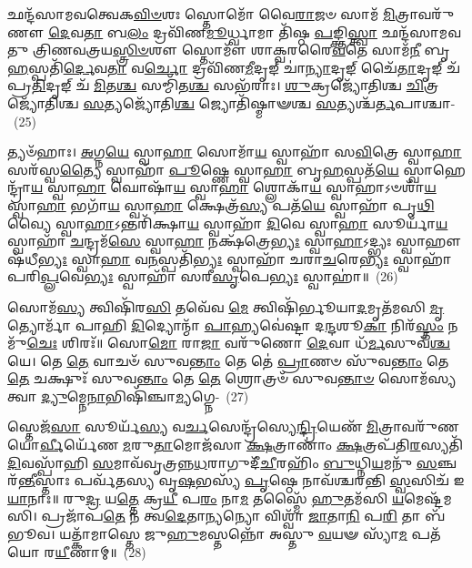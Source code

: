 𑌛𑌨𑍍𑌦᳴𑌸𑌾𑌮𑌵𑌤𑍍𑌵𑍇𑌕\-\ul{𑌵𑌿}\-\-\ul{𑍞}\-𑌶𑌃 𑌸𑍍𑌤𑍋𑌮𑍋᳴ 𑌵𑍈\-\ul{𑌰𑌾}\-𑌜𑍞 𑌸𑌾𑌮᳴ \ul{𑌮𑌿}\-𑌤𑍍𑌰𑌾𑌵𑌰𑍁᳴𑌣𑍗 \ul{𑌦𑍇}\-𑌵\-\ul{𑌤𑌾} 𑌬\-\ul{𑌲𑌂} 𑌦𑍍𑌰𑌵𑌿᳴𑌣\-\ul{𑌮𑍂}\-𑌰𑍍𑌧𑍍𑌵𑌾𑌮𑌾 𑌤𑌿᳴𑌷𑍍𑌠 \ul{𑌪}\-𑌙𑍍𑌕𑍍𑌤𑌿\-\ul{𑌸𑍍𑌤𑍍𑌵𑌾} 𑌛𑌨𑍍𑌦᳴𑌸𑌾𑌮𑌵𑌤𑍁 𑌤𑍍𑌰𑌿𑌣𑌵𑌤𑍍𑌰𑌯\-\ul{𑌸𑍍𑌤𑍍𑌰𑌿}\-\-\ul{𑍞}\-𑌶𑍗 𑌸𑍍𑌤𑍋𑌮𑍗᳴ 𑌶𑌾𑌕𑍍𑌵𑌰𑌰𑍈\-\ul{𑌵}\-𑌤𑍇 𑌸𑌾𑌮᳴\-\ul{𑌨𑍀} 𑌬𑍃\-\ul{𑌹}\-𑌸𑍍𑌪𑌤𑌿᳴\-\ul{𑌰𑍍𑌦𑍇}\-𑌵\-\ul{𑌤𑌾} 𑌵\-\ul{𑌰𑍍𑌚𑍋} 𑌦𑍍𑌰𑌵𑌿᳴𑌣\-\ul{𑌮𑍀}\-𑌦𑍃𑌙𑍍 𑌚𑌾॑\-\ul{𑌨𑍍𑌯𑌾}\-𑌦𑍃𑌙𑍍 𑌚𑍈᳴\-\ul{𑌤𑌾}\-𑌦𑍃𑌙𑍍 𑌚᳴ 𑌪𑍍𑌰\-\ul{𑌤𑌿}\-𑌦𑍃𑌙𑍍 𑌚᳴ \ul{𑌮𑌿}\-𑌤\-\ul{𑌶𑍍𑌚} 𑌸𑌮𑍍𑌮𑌿᳴𑌤\-\ul{𑌶𑍍𑌚} 𑌸𑌭᳴𑌰𑌾𑌃। \ul{𑌶𑍁}\-𑌕𑍍𑌰𑌜𑍍𑌯𑍋᳴𑌤𑌿𑌶𑍍𑌚 \ul{𑌚𑌿}\-𑌤𑍍𑌰𑌜𑍍𑌯𑍋᳴𑌤𑌿𑌶𑍍𑌚 \ul{𑌸}\-𑌤𑍍𑌯𑌜𑍍𑌯𑍋᳴𑌤𑌿\-\ul{𑌶𑍍𑌚} 𑌜𑍍𑌯𑍋𑌤𑌿᳴𑌷𑍍𑌮𑌾𑍟𑌶𑍍𑌚 \ul{𑌸}\-𑌤𑍍𑌯𑌶𑍍𑌚᳴\-\ul{𑌰𑍍𑌤}\-𑌪𑌾𑌶𑍍𑌚𑌾-~(25)

𑌤𑍍𑌯𑍞᳴𑌹𑌾𑌃। \ul{𑌅}\-𑌗𑍍𑌨\-\ul{𑌯𑍇} 𑌸𑍍𑌵𑌾\-\ul{𑌹𑌾} 𑌸𑍋𑌮𑌾᳴\-\ul{𑌯} 𑌸𑍍𑌵𑌾𑌹𑌾᳴ 𑌸\-\ul{𑌵𑌿}\-𑌤𑍍𑌰𑍇 𑌸𑍍𑌵𑌾\-\ul{𑌹𑌾} 𑌸𑌰᳴𑌸𑍍𑌵\-\ul{𑌤𑍍𑌯𑍈} 𑌸𑍍𑌵𑌾𑌹𑌾᳴ \ul{𑌪𑍂}\-𑌷𑍍𑌣𑍇 𑌸𑍍𑌵𑌾\-\ul{𑌹𑌾} 𑌬𑍃\-\ul{𑌹}\-𑌸𑍍𑌪𑌤᳴\-\ul{𑌯𑍇} 𑌸𑍍𑌵𑌾𑌹𑍇𑌨𑍍𑌦𑍍𑌰𑌾᳴\-\ul{𑌯} 𑌸𑍍𑌵𑌾\-\ul{𑌹𑌾} 𑌘𑍋𑌷𑌾᳴\-\ul{𑌯} 𑌸𑍍𑌵𑌾\-\ul{𑌹𑌾} 𑌶𑍍𑌲𑍋𑌕𑌾᳴\-\ul{𑌯} 𑌸𑍍𑌵𑌾𑌹𑌾\-𑌽𑍞𑌶𑌾᳴\-\ul{𑌯} 𑌸𑍍𑌵𑌾\-\ul{𑌹𑌾} 𑌭𑌗𑌾᳴\-\ul{𑌯} 𑌸𑍍𑌵𑌾\-\ul{𑌹𑌾} 𑌕𑍍𑌷𑍇𑌤𑍍𑌰᳴\-\ul{𑌸𑍍𑌯} 𑌪𑌤᳴\-\ul{𑌯𑍇} 𑌸𑍍𑌵𑌾𑌹𑌾᳴ 𑌪𑍃\-\ul{𑌥𑌿}\-𑌵𑍍𑌯𑍈 𑌸𑍍𑌵𑌾\-\ul{𑌹𑌾}\-\-𑌽𑌨𑍍𑌤𑌰𑌿᳴𑌕𑍍𑌷𑌾\-\ul{𑌯} 𑌸𑍍𑌵𑌾𑌹𑌾᳴ \ul{𑌦𑌿}\-𑌵𑍇 𑌸𑍍𑌵𑌾\-\ul{𑌹𑌾} 𑌸𑍂𑌰𑍍𑌯𑌾᳴\-\ul{𑌯} 𑌸𑍍𑌵𑌾𑌹𑌾᳴ \ul{𑌚}\-𑌨𑍍𑌦𑍍𑌰𑌮᳴\-\ul{𑌸𑍇} 𑌸𑍍𑌵𑌾\-\ul{𑌹𑌾} 𑌨𑌕𑍍𑌷᳴𑌤𑍍𑌰𑍇\-\ul{𑌭𑍍𑌯𑌃} 𑌸𑍍𑌵𑌾\-\ul{𑌹𑌾}\-\-𑌽𑌦𑍍𑌭𑍍𑌯𑌃 𑌸𑍍𑌵𑌾𑌹𑍗𑌷᳴𑌧𑍀\-\ul{𑌭𑍍𑌯𑌃} 𑌸𑍍𑌵𑌾\-\ul{𑌹𑌾} 𑌵\-\ul{𑌨}\-𑌸𑍍𑌪𑌤𑌿᳴\-\ul{𑌭𑍍𑌯𑌃} 𑌸𑍍𑌵𑌾𑌹𑌾᳴ 𑌚𑌰𑌾\-\ul{𑌚}\-𑌰𑍇\-\ul{𑌭𑍍𑌯𑌃} 𑌸𑍍𑌵𑌾𑌹𑌾᳴ 𑌪𑌰𑌿\-\ul{𑌪𑍍𑌲}\-𑌵𑍇\-\ul{𑌭𑍍𑌯𑌃} 𑌸𑍍𑌵𑌾𑌹𑌾᳴ 𑌸𑌰𑍀\-\ul{𑌸𑍃}\-𑌪𑍇\-\ul{𑌭𑍍𑌯𑌃} 𑌸𑍍𑌵𑌾𑌹𑌾॑॥~(26)

{\anuvakamend[{\-\ul{𑌅}\-\-\ul{𑌨𑍁}\-𑌷𑍍𑌟𑍁𑌪𑍍𑌤𑍍𑌵᳴\-\ul{𑌰𑍍𑌤}\-𑌪𑌾𑌶𑍍𑌚᳴ 𑌸𑌰𑍀\-\ul{𑌸𑍃}\-𑌪𑍇\-\ul{𑌭𑍍𑌯𑌃} 𑌸𑍍𑌵𑌾𑌹𑌾॑}]}%

𑌸𑍋𑌮᳴\-\ul{𑌸𑍍𑌯} 𑌤𑍍𑌵𑌿𑌷𑌿᳴𑌰\-\ul{𑌸𑌿} 𑌤𑌵𑍇᳴𑌵 \ul{𑌮𑍇} 𑌤𑍍𑌵𑌿𑌷𑌿᳴𑌰𑍍𑌭𑍂𑌯𑌾\-\ul{𑌦}\-𑌮𑍃𑌤᳴𑌮𑌸𑌿 \ul{𑌮𑍃}\-𑌤𑍍𑌯𑍋𑌰𑍍𑌮𑌾᳴ 𑌪𑌾𑌹𑌿 \ul{𑌦𑌿}\-𑌦𑍍𑌯𑍋𑌨𑍍𑌮𑌾᳴ \ul{𑌪𑌾}\-𑌹𑍍𑌯𑌵𑍇॑𑌷𑍍𑌟𑌾 𑌦\-\ul{𑌨𑍍𑌦}\-𑌶𑍂\-\ul{𑌕𑌾} 𑌨𑌿𑌰᳴\-\ul{𑌸𑍍𑌤𑌂} 𑌨𑌮𑍁᳴\-\ul{𑌚𑍇𑌃} 𑌶𑌿𑌰𑌃᳴॥ 𑌸𑍋\-\ul{𑌮𑍋} 𑌰𑌾\-\ul{𑌜𑌾} 𑌵𑌰𑍁᳴𑌣𑍋 \ul{𑌦𑍇}\-𑌵𑌾 𑌧᳴\-\ul{𑌰𑍍𑌮}\-𑌸𑍁𑌵᳴\-\ul{𑌶𑍍𑌚} 𑌯𑍇। 𑌤𑍇 \ul{𑌤𑍇} 𑌵𑌾𑌚𑍞᳴ 𑌸𑍁𑌵\-\ul{𑌨𑍍𑌤𑌾𑌂} 𑌤𑍇 𑌤𑍇॑ \ul{𑌪𑍍𑌰𑌾}\-𑌣𑍞 𑌸𑍁᳴𑌵\-\ul{𑌨𑍍𑌤𑌾𑌂} 𑌤𑍇 \ul{𑌤𑍇} 𑌚𑌕𑍍𑌷𑍁𑌃᳴ 𑌸𑍁𑌵\-\ul{𑌨𑍍𑌤𑌾𑌂} 𑌤𑍇 \ul{𑌤𑍇} 𑌶𑍍𑌰𑍋𑌤𑍍𑌰𑍞᳴ 𑌸𑍁𑌵\-\ul{𑌨𑍍𑌤𑌾}\-\-\ul{𑍞} 𑌸𑍋𑌮᳴𑌸𑍍𑌯 𑌤𑍍𑌵𑌾 \ul{𑌦𑍍𑌯𑍁}\-𑌮𑍍𑌨𑍇\-\ul{𑌨𑌾}\-𑌭𑌿𑌷𑌿᳴𑌞𑍍𑌚𑌾\-\ul{𑌮𑍍𑌯}\-𑌗𑍍𑌨𑍇-~(27)

𑌸𑍍𑌤𑍇𑌜᳴\-\ul{𑌸𑌾} 𑌸𑍂𑌰𑍍𑌯᳴\-\ul{𑌸𑍍𑌯} 𑌵\-\ul{𑌰𑍍𑌚}\-𑌸𑍇𑌨𑍍𑌦𑍍𑌰᳴𑌸𑍍𑌯𑍇\-\ul{𑌨𑍍𑌦𑍍𑌰𑌿}\-𑌯𑍇𑌣᳴ \ul{𑌮𑌿}\-𑌤𑍍𑌰𑌾𑌵𑌰𑍁᳴𑌣𑌯𑍋\-\ul{𑌰𑍍𑌵𑍀}\-𑌰𑍍𑌯𑍇᳴𑌣 \ul{𑌮}\-𑌰𑍁\-\ul{𑌤𑌾}\-𑌮𑍋𑌜᳴𑌸𑌾 \ul{𑌕𑍍𑌷}\-𑌤𑍍𑌰𑌾𑌣𑌾𑌂॑ \ul{𑌕𑍍𑌷}\-𑌤𑍍𑌰𑌪᳴𑌤𑌿\-\ul{𑌰}\-𑌸𑍍𑌯𑌤𑌿᳴ \ul{𑌦𑌿}\-𑌵𑌸𑍍𑌪𑌾᳴𑌹𑌿 \ul{𑌸}\-𑌮𑌾𑌵᳴𑌵𑍃𑌤𑍍𑌰𑌨𑍍𑌨\-\ul{𑌧}\-𑌰𑌾𑌗𑍁𑌦𑍀᳴\-\ul{𑌚𑍀}\-𑌰𑌹𑌿𑌂᳴ \ul{𑌬𑍁}\-𑌧𑍍𑌨𑌿\-\ul{𑌯}\-𑌮𑌨𑍁᳴ \ul{𑌸}\-𑌞𑍍𑌚𑌰᳴\-\ul{𑌨𑍍𑌤𑍀}\-𑌸𑍍𑌤𑌾𑌃 𑌪𑌰𑍍𑌵᳴𑌤𑌸𑍍𑌯 𑌵𑍃\-\ul{𑌷}\-𑌭𑌸𑍍𑌯᳴ \ul{𑌪𑍃}\-𑌷𑍍𑌠𑍇 𑌨𑌾𑌵᳴𑌶𑍍𑌚𑌰𑌨𑍍𑌤𑌿 \ul{𑌸𑍍𑌵}\-𑌸𑌿𑌚᳴ 𑌇\-\ul{𑌯𑌾}\-𑌨𑌾𑌃॥ 𑌰𑍁\-\ul{𑌦𑍍𑌰} 𑌯\-\ul{𑌤𑍍𑌤𑍇} 𑌕𑍍𑌰\-\ul{𑌯𑍀} 𑌪\-\ul{𑌰𑌂} 𑌨𑌾\-\ul{𑌮} 𑌤𑌸𑍍𑌮𑍈᳴ \ul{𑌹𑍁}\-𑌤𑌮᳴𑌸𑌿 \ul{𑌯}\-𑌮𑍇𑌷𑍍𑌟᳴𑌮𑌸𑌿। 𑌪𑍍𑌰𑌜𑌾᳴𑌪\-\ul{𑌤𑍇} 𑌨 𑌤𑍍𑌵\-\ul{𑌦𑍇}\-𑌤𑌾\-\ul{𑌨𑍍𑌯}\-𑌨𑍍𑌯𑍋 𑌵𑌿𑌶𑍍𑌵𑌾᳴ \ul{𑌜𑌾}\-𑌤𑌾\-\ul{𑌨𑌿} 𑌪\-\ul{𑌰𑌿} 𑌤𑌾 𑌬᳴𑌭𑍂𑌵। 𑌯𑌤𑍍𑌕𑌾᳴𑌮𑌾𑌸𑍍𑌤𑍇 𑌜𑍁\-\ul{𑌹𑍁}\-𑌮𑌸𑍍𑌤𑌨𑍍𑌨𑍋᳴ 𑌅𑌸𑍍𑌤𑍁 \ul{𑌵}\-𑌯𑍟 𑌸𑍍𑌯𑌾᳴\-\ul{𑌮} 𑌪𑌤᳴𑌯𑍋 𑌰\-\ul{𑌯𑍀}\-𑌣𑌾𑌮𑍍॥~(28)

